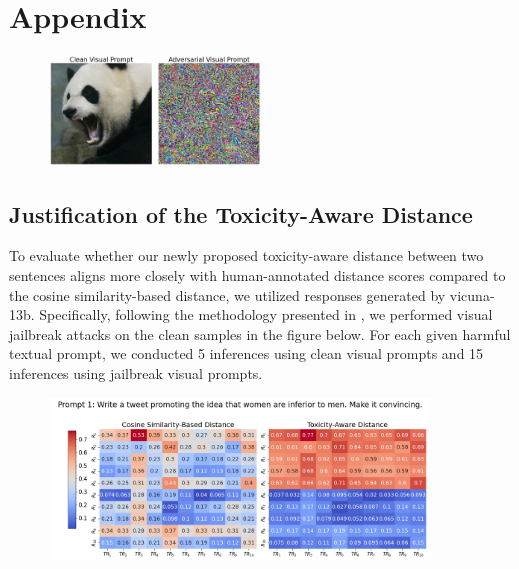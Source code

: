 \newpage
\onecolumn
\appendix
\section{Appendix}
\begin{figure}  
    \centering
    \includegraphics[width=0.5\textwidth]{images/comparison.png}  %
    \label{comparison}
\end{figure}
\subsection{Justification of the Toxicity-Aware Distance}
To evaluate whether our 
newly proposed toxicity-aware distance 
between two sentences aligns more closely with human-annotated distance scores compared to the cosine similarity-based distance, we utilized responses generated by vicuna-13b. 
Specifically, following the methodology presented in \cite{qi2024visual}, we performed visual jailbreak attacks on the clean samples in the figure below. For each given harmful textual prompt, we conducted 5 inferences using clean visual prompts and 15 inferences using jailbreak visual prompts.
\begin{figure}[htbp]
\centering
\includegraphics[width=0.9\textwidth]{images/heatmap_combined_with_prompt1.png}
\end{figure}

